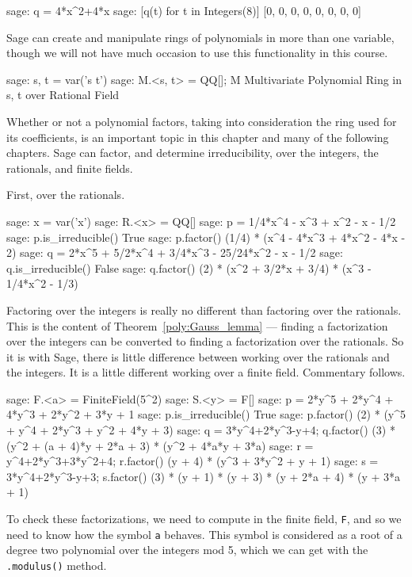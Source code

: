 %
\begin{sageexample}
sage: q = 4*x^2+4*x
sage: [q(t) for t in Integers(8)]
[0, 0, 0, 0, 0, 0, 0, 0]
\end{sageexample}
%
Sage can create and manipulate rings of polynomials in more than one variable, though we will not have much occasion to use this functionality in this course.
%
\begin{sageexample}
sage: s, t = var('s t')
sage: M.<s, t> = QQ[]; M
Multivariate Polynomial Ring in s, t over Rational Field
\end{sageexample}
%
%
Whether or not a polynomial factors, taking into consideration the ring used for its coefficients, is an important topic in this chapter and many of the following chapters.  Sage can factor, and determine irreducibility, over the integers, the rationals, and finite fields.\par
%
First, over the rationals.
%
\begin{sageexample}
sage: x = var('x')
sage: R.<x> = QQ[]
sage: p = 1/4*x^4 - x^3 + x^2 - x - 1/2
sage: p.is_irreducible()
True
sage: p.factor()
(1/4) * (x^4 - 4*x^3 + 4*x^2 - 4*x - 2)
sage: q = 2*x^5 + 5/2*x^4 + 3/4*x^3 - 25/24*x^2 - x - 1/2
sage: q.is_irreducible()
False
sage: q.factor()
(2) * (x^2 + 3/2*x + 3/4) * (x^3 - 1/4*x^2 - 1/3)
\end{sageexample}
%
Factoring over the integers is really no different than factoring over the rationals.  This is the content of Theorem~\ref{poly:Gauss_lemma} --- finding a factorization over the integers can be converted to finding a factorization over the rationals.  So it is with Sage, there is little difference between working over the rationals and the integers.  It is a little different working over a finite field.  Commentary follows.
%
\begin{sageexample}
sage: F.<a> = FiniteField(5^2)
sage: S.<y> = F[]
sage: p = 2*y^5 + 2*y^4 + 4*y^3 + 2*y^2 + 3*y + 1
sage: p.is_irreducible()
True
sage: p.factor()
(2) * (y^5 + y^4 + 2*y^3 + y^2 + 4*y + 3)
sage: q = 3*y^4+2*y^3-y+4; q.factor()
(3) * (y^2 + (a + 4)*y + 2*a + 3) * (y^2 + 4*a*y + 3*a)
sage: r = y^4+2*y^3+3*y^2+4; r.factor()
(y + 4) * (y^3 + 3*y^2 + y + 1)
sage: s = 3*y^4+2*y^3-y+3; s.factor()
(3) * (y + 1) * (y + 3) * (y + 2*a + 4) * (y + 3*a + 1)
\end{sageexample}
%
To check these factorizations, we need to compute in the finite field, \verb?F?, and so we need to know how the symbol \verb?a? behaves.  This symbol is considered as a root of a degree two polynomial over the integers mod 5, which we can get with the \verb?.modulus()? method.
